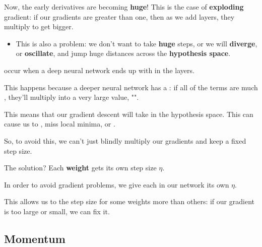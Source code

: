         Now, the early derivatives are becoming \textbf{huge}! This is the case of \textbf{exploding} gradient: if our gradients are greater than one, then as we add layers, they multiply to get bigger.

        \begin{itemize}
            \item This is also a problem: we don't want to take \textbf{huge} steps, or we will \textbf{diverge}, or \textbf{oscillate}, and jump huge distances across the \textbf{hypothesis space}.\\
        \end{itemize}
        
        
        
        \begin{definition}
             occur when a deep neural network ends up with  in the  layers. 
            
            This happens because a deeper neural network has a : if all of the terms are much , they'll multiply into a very large value, "".
            
            This means that our gradient descent will take  in the hypothesis space. This can cause us to , miss local minima, or .
        \end{definition}
        
        So, to avoid this, we can't just blindly multiply our gradients and keep a fixed step size.
        
        The solution? Each \textbf{weight} gets its own step size $\eta$.\\
        
        \begin{concept}
            In order to avoid  gradient problems, we give each  in our network its own  $\eta$.
            
            This allows us to  the step size for some weights more than others: if our gradient is too large or small, we can fix it.
        \end{concept}
    \secdiv
    
    \secdiv

    \pagebreak
    
    \subsection{Momentum}
    

